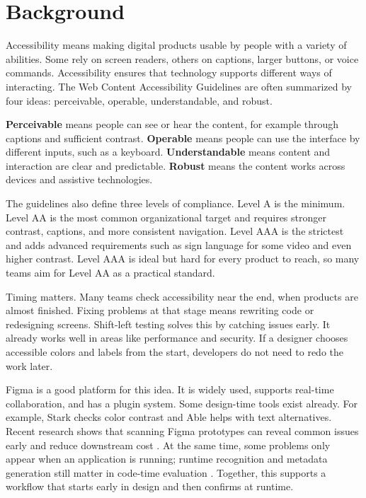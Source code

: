 \documentclass[12pt]{article}
\begin{document}
\section{Background}
Accessibility means making digital products usable by people with a variety of abilities. Some rely on screen readers, others on captions, larger buttons, or voice commands. Accessibility ensures that technology supports different ways of interacting. The Web Content Accessibility Guidelines are often summarized by four ideas: perceivable, operable, understandable, and robust.

\textbf{Perceivable} means people can see or hear the content, for example through captions and sufficient contrast. \textbf{Operable} means people can use the interface by different inputs, such as a keyboard. \textbf{Understandable} means content and interaction are clear and predictable. \textbf{Robust} means the content works across devices and assistive technologies.

The guidelines also define three levels of compliance. Level A is the minimum. Level AA is the most common organizational target and requires stronger contrast, captions, and more consistent navigation. Level AAA is the strictest and adds advanced requirements such as sign language for some video and even higher contrast. Level AAA is ideal but hard for every product to reach, so many teams aim for Level AA as a practical standard.

Timing matters. Many teams check accessibility near the end, when products are almost finished. Fixing problems at that stage means rewriting code or redesigning screens. Shift-left testing solves this by catching issues early. It already works well in areas like performance and security. If a designer chooses accessible colors and labels from the start, developers do not need to redo the work later.

Figma is a good platform for this idea. It is widely used, supports real-time collaboration, and has a plugin system. Some design-time tools exist already. For example, Stark checks color contrast and Able helps with text alternatives. Recent research shows that scanning Figma prototypes can reveal common issues early and reduce downstream cost \cite{huang2024a11yfigma,chen2024figmaapps}. At the same time, some problems only appear when an application is running; runtime recognition and metadata generation still matter in code-time evaluation \cite{zhang2021screenrecognition}. Together, this supports a workflow that starts early in design and then confirms at runtime.
\end{document}

